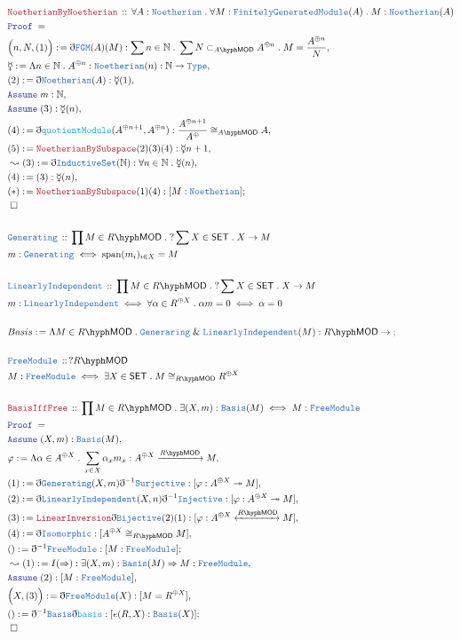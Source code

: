 \documentclass[12pt]{scrartcl}
\newcommand{\TYPE}[1]{\textcolor{NavyBlue}{\mathtt{#1}}}
\newcommand{\FUNC}[1]{\textcolor{Cerulean}{\mathtt{#1}}}
\newcommand{\LOGIC}[1]{\textcolor{Blue}{\mathtt{#1}}}
\newcommand{\THM}[1]{\textcolor{Maroon}{\mathtt{#1}}}
\renewcommand{\.}{\; . \;}
\newcommand{\de}{: \kern 0.1pc =}
\newcommand{\Theorem}[2]{& \THM{#1} \, :: \, #2 \\ & \Proof = \\ }
\newcommand{\DeclareType}[2]{& \TYPE{#1} \, :: \, #2 \\}
\newcommand{\DefineType}[3]{& #1 : \TYPE{#2} \iff #3 \\}
\newcommand{\Page}[1]{ \begin{align*} #1 \end{align*}   }
\newcommand{ \bd }{ \ByDef }
\renewcommand{\And}{\; \& \;}
\newcommand{\Type}{\TYPE{Type}}
\newcommand{\Nat}{\mathbb{N} }
\newcommand{\ToSurj}{\twoheadrightarrow}
\newcommand{\Say}[3]{& #1 \de #2 : #3, \\}
\newcommand{\Conclude}[3]{& #1 \de #2 : #3; \\}
\newcommand{\Derive}[3]{& \leadsto #1 \de #2 : #3, \\}
\newcommand{\Assume}[2]{& \LOGIC{Assume} \; #1 : #2, \\}
\newcommand{\QED}{\; \square}
\newcommand{\EndProof}{& \QED \\}
\newcommand{\ByDef}{\eth}
\newcommand{\Proof}{\LOGIC{Proof} \; }
\newcommand{\Arrow}[1]{\xrightarrow{#1}}
\newcommand{\ToIso}[1]{\xleftrightarrow{#1}}
\newcommand{\SET}{\mathsf{SET}}
\newcommand{\submod}[1]{\subset_{\LMOD{#1}}}
\newcommand{\FGM}{\TYPE{FinitelyGeneratedModule}}
\newcommand{\LI}{\TYPE{LinearlyIndependent}}
\newcommand{\FM}{\TYPE{FreeModule}}
\DeclareMathOperator{\Span}{span}
\newcommand{\LMOD}[1]{#1\hyph\mathsf{MOD}}
\begin{document}
\Page{
	\Theorem{NoetherianByNoetherian}{\forall A : \TYPE{Noetherian} \. \forall M : \FGM(A) \. 
		M : \TYPE{Noetherian}(A)
	}
	\Say{\Big(n,N,(1)\Big)}{\bd \TYPE{FGM}(A)(M)}{ \sum n \in \Nat \. \sum N \submod{A} A^{\oplus n} \. 
			M = \frac{A^{\oplus n}}{N} }
	\Say{ \mercury}{\Lambda n \in \Nat \. A^{\oplus n} : \TYPE{Noetherian}(n)}
	{ \Nat \to \Type  }
	\Say{(2)}{\bd \TYPE{Noetherian}(A)}{\mercury(1)}
	\Assume{m}{\Nat}
	\Assume{(3)}{\mercury(n)}
	\Say{(4)}{\bd \FUNC{quotientModule}(A^{\oplus n +1},A^{\oplus n})}{ \frac{A^{\oplus n+1}}{A^\oplus} \cong_{\LMOD{A}} A   }   
	\Say{(5)}{\THM{NoetherianBySubspace}(2)(3)(4)}{\mercury{n+1}}
	\Derive{(3)}{\bd \TYPE{InductiveSet}(\Nat)}{\forall n \in \Nat \. \mercury(n)}
	\Say{(4)}{(3)}{\mercury(n)}
	\Conclude{(*)}{\THM{NoetherianBySubspace}(1)(4)}{[M : \TYPE{Noetherian}]}
	\EndProof
	\\
	\DeclareType{Generating}{\prod M \in \LMOD{R} \.?\sum X \in \SET \. X \to M}
	\DefineType{m}{Generating}{\Span(m_i)_{i \in X} = M}
	\\
	\DeclareType{\LI}{\prod M \in \LMOD{R} \. ?\sum X \in \SET \. X \to M}
	\DefineType{m}{\LI}{\forall \alpha \in R^{\oplus X} \. \alpha m = 0 \iff \alpha = 0}
	\\
	\Conclude{Basis}{\Lambda M \in \LMOD{R} \.  \TYPE{Generaring} \And \LI(M)}{\LMOD{R} \to \TYPE}
	\\
	\DeclareType{\FM}{?\LMOD{R}}
	\DefineType{M}{\FM}{\exists X \in \SET \.  M \cong_{\LMOD{R}} R^{\oplus X}}
	\\
	\Theorem{BasisIffFree}{\prod M \in \LMOD{R} \. \exists (X,m) : \TYPE{Basis}(M) \iff M : \FM}
	\Assume{(X,m)}{\TYPE{Basis}(M)}
	\Say{\varphi}{\Lambda \alpha \in A^{\oplus X} \. \sum_{x \in X} \alpha_x m_x }{A^{\oplus X} \Arrow{\LMOD{R}} M}
	\Say{(1)}{\bd \TYPE{Generating}(X,m)\bd^{-1} \TYPE{Surjective}}{[\varphi : A^{\oplus X} \ToSurj M]}
	\Say{(2)}{\bd \LI(X,n)\bd^{-1}\TYPE{Injective}}{[\varphi : A^{\oplus X} \ToSurj M]}
	\Say{(3)}{\THM{LinearInversion}\bd \TYPE{Bijective}(2)(1)}{[\varphi : A^{\oplus X} \ToIso{\LMOD{R}} M]}
	\Say{(4)}{\bd\TYPE{Isomorphic}}{[A^{\oplus X} \cong_{\LMOD{R}} M]}
	\Conclude{()}{\bd^{-1}\FM}{[M : \FM]}
	\Derive{(1)}{I(\Rightarrow)}{\exists (X,m) : \TYPE{Basis}(M) \Rightarrow M : \FM}
	\Assume{(2)}{[M : \FM]}
	\Say{\Big(X,(3)\Big)}{\bd \FM(X)}{[M = R^{\oplus X}]}
	\Conclude{()}{\bd^{-1} \TYPE{Basis}\bd \FUNC{basis}}{[e(R,X) : \TYPE{Basis}(X)]}
	\EndProof
}
\end{document}
